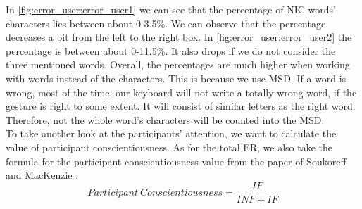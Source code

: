 In \cref{fig:error_user:error_user1} we can see that the percentage of NIC words' characters lies between about 0-3.5\%. We can observe that the percentage decreases a bit from the left to the right box. In \cref{fig:error_user:error_user2} the percentage is between about 0-11.5\%. It also drops if we do not consider the three mentioned words. Overall, the percentages are much higher when working with words instead of the characters. This is because we use MSD. If a word is wrong, most of the time, our keyboard will not write a totally wrong word, if the gesture is right to some extent. It will consist of similar letters as the right word. Therefore, not the whole word's characters will be counted into the MSD.\\

To take another look at the participants' attention, we want to calculate the value of participant conscientiousness. As for the total ER, we also take the formula for the participant conscientiousness value from the paper of Soukoreff and MacKenzie \cite{10.1145/642611.642632}:
\begin{equation}
    Participant\ Conscientiousness = \frac{IF}{INF + IF}
    \label{eq:total_er}
\end{equation}

